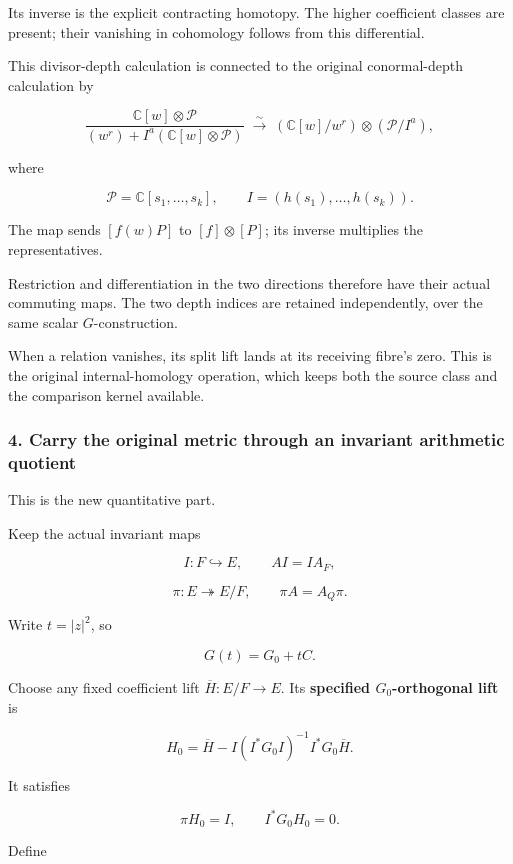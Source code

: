 Its inverse is the explicit contracting homotopy. The higher coefficient classes are present; their vanishing in cohomology follows from this differential.

This divisor-depth calculation is connected to the original conormal-depth calculation by

\[
\boxed{
\frac{\mathbb C[w]\otimes\mathcal P}
{(w^r)+I^a(\mathbb C[w]\otimes\mathcal P)}
\;\xrightarrow{\sim}\;
(\mathbb C[w]/w^r)\otimes(\mathcal P/I^a),
}
\]

where

\[
\mathcal P=\mathbb C[s_1,\ldots,s_k],\qquad
I=(h(s_1),\ldots,h(s_k)).
\]

The map sends \([f(w)P]\) to \([f]\otimes[P]\); its inverse multiplies the representatives.

Restriction and differentiation in the two directions therefore have their actual commuting maps. The two depth indices are retained independently, over the same scalar \(G\)-construction.

When a relation vanishes, its split lift lands at its receiving fibre's zero. This is the original internal-homology operation, which keeps both the source class and the comparison kernel available.

\subsubsection{4. Carry the original metric through an invariant arithmetic quotient}\label{endpoint-exponential_constituent_original--carry-the-original-metric-through-an-invariant-arithmetic-quotient}

This is the new quantitative part.

Keep the actual invariant maps

\[
\boxed{
I:F\hookrightarrow E,\qquad AI=IA_F,
}
\]

\[
\boxed{
\pi:E\twoheadrightarrow E/F,\qquad \pi A=A_Q\pi.
}
\]

Write \(t=|z|^2\), so

\[
G(t)=G_0+tC.
\]

Choose any fixed coefficient lift \(\overline H:E/F\to E\). Its \textbf{specified \(G_0\)-orthogonal lift} is

\[
H_0
=
\overline H-
I(I^*G_0I)^{-1}I^*G_0\overline H.
\]

It satisfies

\[
\pi H_0=I,\qquad I^*G_0H_0=0.
\]

Define

